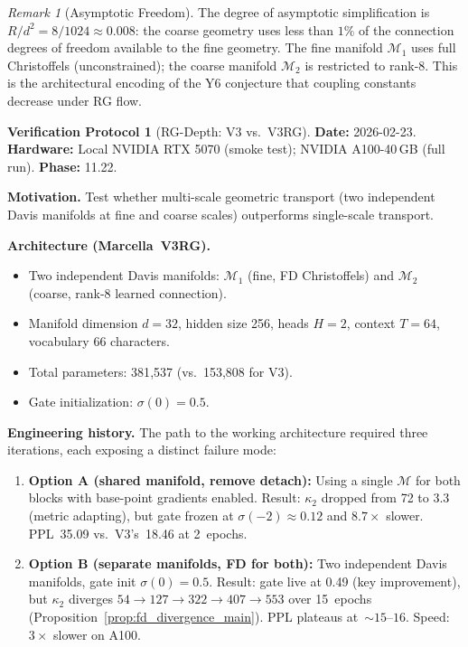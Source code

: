 \documentclass[11pt,a4paper]{article}
\theoremstyle{definition}
\newtheorem{protocol}[theorem]{Verification Protocol}
\theoremstyle{remark}
\newtheorem{remark}[theorem]{Remark}
\begin{document}
\begin{remark}[Asymptotic 
Freedom]\label{rem:asymptotic_freedom_main}
The degree of asymptotic simplification is 
$R/d^2 = 8/1024 \approx 0.008$: the coarse geometry uses less 
than $1\%$ of the connection degrees of freedom available to the 
fine geometry. The fine manifold $\mathcal{M}_1$ uses full 
Christoffels (unconstrained); the coarse manifold $\mathcal{M}_2$ 
is restricted to rank-8. This is the architectural encoding of 
the Y6 conjecture that coupling constants decrease under RG flow.
\end{remark}

\begin{protocol}[RG-Depth: V3 vs.\ V3RG]%
\label{prot:rg_depth}
\textbf{Date:} 2026-02-23.  \textbf{Hardware:} Local NVIDIA RTX 
5070 (smoke test); NVIDIA A100-40\,GB (full run).  
\textbf{Phase:} 11.22.

\medskip
\textbf{Motivation.} Test whether multi-scale geometric transport 
(two independent Davis manifolds at fine and coarse scales) 
outperforms single-scale transport.

\medskip
\textbf{Architecture (Marcella~V3RG).}
\begin{itemize}[nosep]
  \item Two independent Davis manifolds: $\mathcal{M}_1$ 
  (fine, FD Christoffels) and $\mathcal{M}_2$ (coarse, 
  rank-8 learned connection).
  \item Manifold dimension $d = 32$, hidden size 256, heads 
  $H = 2$, context $T = 64$, vocabulary 66 characters.
  \item Total parameters: 381{,}537 (vs.\ 153{,}808 for V3).
  \item Gate initialization: $\sigma(0) = 0.5$.
\end{itemize}

\textbf{Engineering history.} The path to the working architecture 
required three iterations, each exposing a distinct failure mode:

\begin{enumerate}[nosep]
  \item \textbf{Option A (shared manifold, remove detach):} Using 
  a single $\mathcal{M}$ for both blocks with base-point gradients 
  enabled. Result: $\kappa_2$ dropped from 72 to 3.3 (metric 
  adapting), but gate frozen at $\sigma(-2) \approx 0.12$ and 
  $8.7\times$ slower. PPL~35.09 vs.\ V3's~18.46 at 2~epochs.
  
  \item \textbf{Option B (separate manifolds, FD for both):} Two 
  independent Davis manifolds, gate init $\sigma(0) = 0.5$. 
  Result: gate live at 0.49 (key improvement), but $\kappa_2$ 
  diverges $54 \to 127 \to 322 \to 407 \to 553$ over 15~epochs 
  (Proposition~\ref{prop:fd_divergence_main}). PPL plateaus 
  at~${\sim}15$--$16$. Speed: $3\times$ slower on A100.
  

\end{enumerate}
\end{protocol}
\end{document}
